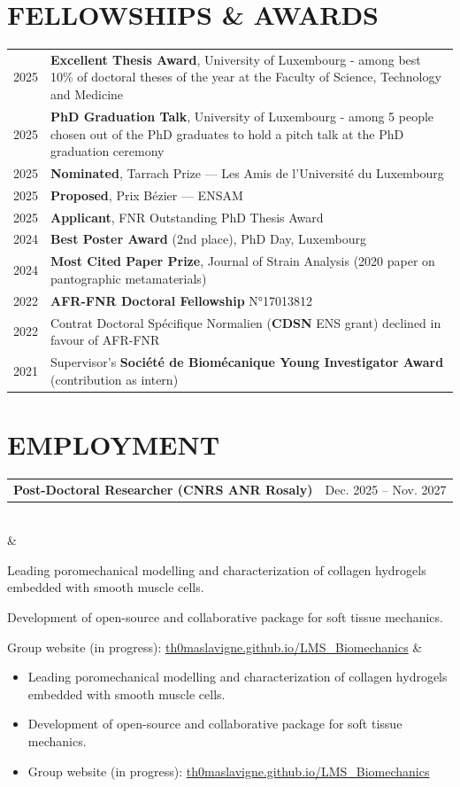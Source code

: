 \documentclass[10pt, a4paper]{article}
\makeatletter
\newcommand{\cventry}[4]{%
  \noindent
  \begin{tabularx}{\linewidth}{@{}Xr@{}}
    {\fontsize{11.5}{12.5}\selectfont\textbf{#1}} & \textcolor{medgray}{#2}
  \end{tabularx}\\[0pt]
  \noindent{\textit{\textcolor{darkgray}{#3}}}
  \vspace{-4pt}
  \ifx&#4&\else
    \begin{itemize}#4\end{itemize}
  \fi
  \vspace{3pt}
}
\makeatother
\begin{document}
\newpage

\section{FELLOWSHIPS \& AWARDS}

\noindent
\begin{tabularx}{\linewidth}{lX}
  2025 & \textbf{Excellent Thesis Award}, University of Luxembourg - among best 10\% of doctoral theses of the year at the Faculty of Science, Technology and Medicine \\
  2025 & \textbf{PhD Graduation Talk}, University of Luxembourg - among 5 people chosen out of the PhD graduates to hold a pitch talk at the PhD graduation ceremony \\
  2025 & \textbf{Nominated}, Tarrach Prize — Les Amis de l'Université du Luxembourg \\
  2025 & \textbf{Proposed}, Prix Bézier — ENSAM \\
  2025 & \textbf{Applicant}, FNR Outstanding PhD Thesis Award \\
  2024 & \textbf{Best Poster Award} (2nd place), PhD Day, Luxembourg \\
  2024 & \textbf{Most Cited Paper Prize}, Journal of Strain Analysis (2020 paper on pantographic metamaterials) \\
  2022 & \textbf{AFR-FNR Doctoral Fellowship} N°17013812 \\
  2022 & Contrat Doctoral Spécifique Normalien (\textbf{CDSN} ENS grant) declined in favour of AFR-FNR \\
  2021 & Supervisor's \textbf{Société de Biomécanique Young Investigator Award} (contribution as intern) \\
\end{tabularx}


\section{EMPLOYMENT}

\cventry{Post-Doctoral Researcher (CNRS ANR Rosaly)}{Dec. 2025 – Nov. 2027}%
{Laboratoire de Mécanique des Solides (LMS), École Polytechnique, CNRS, UMR 7649}{%
  \item Leading poromechanical modelling and characterization of collagen hydrogels embedded with smooth muscle cells.
  \item Development of open-source and collaborative package for soft tissue mechanics.
  \item Group website (in progress): \href{https://th0maslavigne.github.io/LMS_Biomechanics/home.html}{th0maslavigne.github.io/LMS\_Biomechanics}
}
\end{document}
